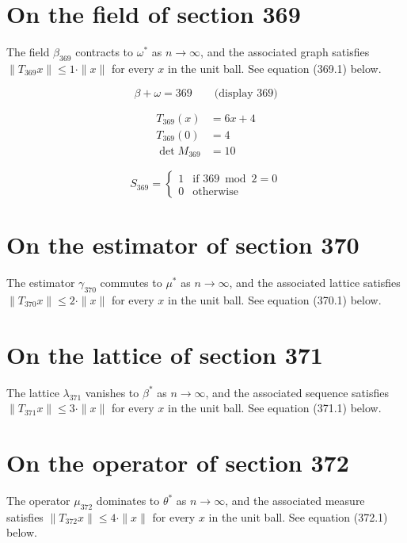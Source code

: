 \documentclass{article}
\begin{document}
\section{On the field of section 369}
The field $\beta_{369}$ contracts to $\omega^{*}$ as $n \to \infty$,
and the associated graph satisfies $\|T_{369} x\| \leq 1 \cdot \|x\|$
for every $x$ in the unit ball. See equation (369.1) below.

$$
\beta + \omega = 369 \qquad \text{(display 369)}
$$

\begin{align}
T_{369}(x) &= 6 x + 4 \\
T_{369}(0) &= 4 \\
\det M_{369} &= 10
\end{align}

\begin{equation}
S_{369} = \begin{cases} 1 & \text{if } 369 \bmod 2 = 0 \\ 0 & \text{otherwise} \end{cases}
\end{equation}

\section{On the estimator of section 370}
The estimator $\gamma_{370}$ commutes to $\mu^{*}$ as $n \to \infty$,
and the associated lattice satisfies $\|T_{370} x\| \leq 2 \cdot \|x\|$
for every $x$ in the unit ball. See equation (370.1) below.

\section{On the lattice of section 371}
The lattice $\lambda_{371}$ vanishes to $\beta^{*}$ as $n \to \infty$,
and the associated sequence satisfies $\|T_{371} x\| \leq 3 \cdot \|x\|$
for every $x$ in the unit ball. See equation (371.1) below.

\section{On the operator of section 372}
The operator $\mu_{372}$ dominates to $\theta^{*}$ as $n \to \infty$,
and the associated measure satisfies $\|T_{372} x\| \leq 4 \cdot \|x\|$
for every $x$ in the unit ball. See equation (372.1) below.
\end{document}
